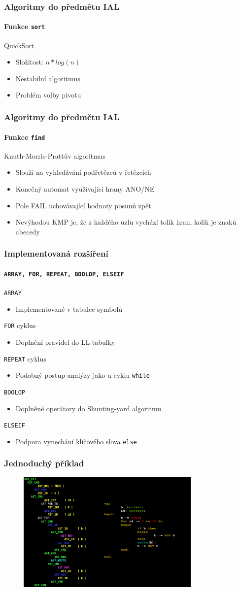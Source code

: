\documentclass[12pt]{beamer}
\begin{document}
\begin{frame}
	\frametitle{Algoritmy do předmětu IAL}
	\framesubtitle{Funkce \texttt{sort}}
	{\Large QuickSort}
	\begin{itemize}
		\item Složitost: $n*log(n)$
		\item Nestabilní algoritmus
		\item Problém volby pivotu
	\end{itemize}
\end{frame}

\begin{frame}
	\frametitle{Algoritmy do předmětu IAL}
	\framesubtitle{Funkce \texttt{find}}
	{\Large Knuth-Morris-Prattův algoritmus}
	\begin{itemize}
		\item Slouží na vyhledávání podřetězců v řetězcích
		\item Konečný automat využívající hrany ANO/NE
		\item Pole FAIL uchovávající hodnoty posunů zpět
		\item Nevýhodou KMP je, že z každého uzlu vychází tolik hran, kolik je znaků abecedy
	\end{itemize}
\end{frame}

\begin{frame}
	\frametitle{Implementovaná rozšíření}
	\framesubtitle{\texttt{ARRAY, FOR, REPEAT, BOOLOP, ELSEIF}}
	\texttt{ARRAY}
	\begin{itemize}
		\item Implementované v tabulce symbolů
	\end{itemize}
	\texttt{FOR} cyklus
	\begin{itemize}
		\item Doplnění pravidel do LL-tabulky
	\end{itemize}
	\texttt{REPEAT} cyklus
	\begin{itemize}
		\item Podobný postup analýzy jako u cyklu \texttt{while}
	\end{itemize}
	\texttt{BOOLOP}
	\begin{itemize}
		\item Doplněné operátory do Shunting-yard algoritmu
	\end{itemize}
	\texttt{ELSEIF}
	\begin{itemize}
		\item Podpora vynechání klíčového slova \texttt{else}
	\end{itemize}
\end{frame}

\begin{frame}
	\frametitle{Jednoduchý příklad}
	\begin{figure}
		\centering
			\includegraphics[width=0.8\textwidth]{program.png}
	\end{figure}
\end{frame}
\end{document}
